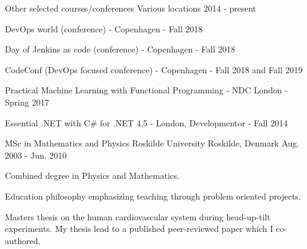 \begin{cventries}
\cventry
{Other selected courses/conferences} %
{Various locations} %
{} %
{2014 - present} %
{ %
\begin{cvitems}
\item{DevOps world (conference) - Copenhagen - Fall 2018}
\item{Day of Jenkins as code (conference) - Copenhagen - Fall 2018}
\item {CodeConf (DevOps focused conference) - Copenhagen - Fall 2018 and Fall 2019}
\item {Practical Machine Learning with Functional Programming - NDC London - Spring 2017}
\item {Essential .NET with C\# for .NET 4.5 - London, Developmentor - Fall 2014}
\end{cvitems}
}

\cventry
{MSc in Mathematics and Physics} %
{Roskilde University}
{Roskilde, Denmark} %
{Aug. 2003 - Jun. 2010} %
{ %
\begin{cvitems}
\item {Combined degree in Physics and Mathematics.}
\item {Education philosophy emphasizing teaching through problem oriented projects.}
\item Masters thesis on the human cardiovascular system during head-up-tilt experiments. My thesis lead to a published peer-reviewed paper which I co-authored.
\end{cvitems}
}


\end{cventries}
